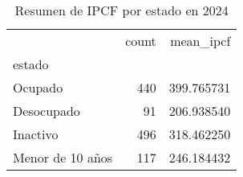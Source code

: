\begin{table}
\caption{Resumen de IPCF por estado en 2024}
\label{tab:ipcf_estado_2004}
\begin{tabular}{lrr}
\toprule
 & count & mean_ipcf \\
estado &  &  \\
\midrule
Ocupado & 440 & 399.765731 \\
Desocupado & 91 & 206.938540 \\
Inactivo & 496 & 318.462250 \\
Menor de 10 años & 117 & 246.184432 \\
\bottomrule
\end{tabular}
\end{table}
